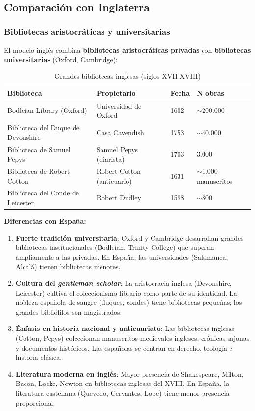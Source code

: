 \documentclass[11pt,a4paper]{article}
\begin{document}
\subsection{Comparación con Inglaterra}

\subsubsection{Bibliotecas aristocráticas y universitarias}

El modelo inglés combina \textbf{bibliotecas aristocráticas privadas} con \textbf{bibliotecas universitarias} (Oxford, Cambridge):

\begin{table}[h]
\centering
\begin{tabular}{llll}
\toprule
\textbf{Biblioteca} & \textbf{Propietario} & \textbf{Fecha} & \textbf{N obras} \\
\midrule
Bodleian Library (Oxford) & Universidad de Oxford & 1602 & $\sim$200.000 \\
Biblioteca del Duque de Devonshire & Casa Cavendish & 1753 & $\sim$40.000 \\
Biblioteca de Samuel Pepys & Samuel Pepys (diarista) & 1703 & 3.000 \\
Biblioteca de Robert Cotton & Robert Cotton (anticuario) & 1631 & $\sim$1.000 manuscritos \\
Biblioteca del Conde de Leicester & Robert Dudley & 1588 & $\sim$800 \\
\bottomrule
\end{tabular}
\caption{Grandes bibliotecas inglesas (siglos XVII-XVIII)}
\end{table}

\textbf{Diferencias con España:}

\begin{enumerate}
\item \textbf{Fuerte tradición universitaria}: Oxford y Cambridge desarrollan grandes bibliotecas institucionales (Bodleian, Trinity College) que superan ampliamente a las privadas. En España, las universidades (Salamanca, Alcalá) tienen bibliotecas menores.

\item \textbf{Cultura del \textit{gentleman scholar}}: La aristocracia inglesa (Devonshire, Leicester) cultiva el coleccionismo librario como parte de su identidad. La nobleza española de sangre (duques, condes) tiene bibliotecas pequeñas; los grandes bibliófilos son magistrados.

\item \textbf{Énfasis en historia nacional y anticuariato}: Las bibliotecas inglesas (Cotton, Pepys) coleccionan manuscritos medievales ingleses, crónicas sajonas y documentos históricos. Las españolas se centran en derecho, teología e historia clásica.

\item \textbf{Literatura moderna en inglés}: Mayor presencia de Shakespeare, Milton, Bacon, Locke, Newton en bibliotecas inglesas del XVIII. En España, la literatura castellana (Quevedo, Cervantes, Lope) tiene menor presencia proporcional.
\end{enumerate}
\end{document}
